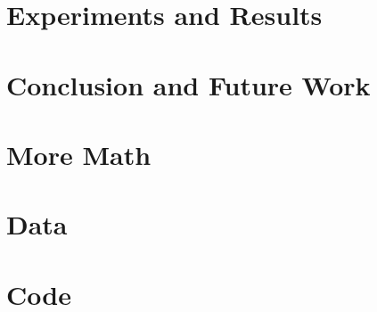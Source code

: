 \documentclass[12pt]{report}
\begin{document}
\chapter{Experiments and Results}
\label{chap:results}


\chapter{Conclusion and Future Work}
\label{chap:outro}


\begin{appendices}


\chapter{More Math}


\chapter{Data}


\chapter{Code}

\end{appendices}

\printbibliography[heading=bibintoc,title={References}]
\end{document}
